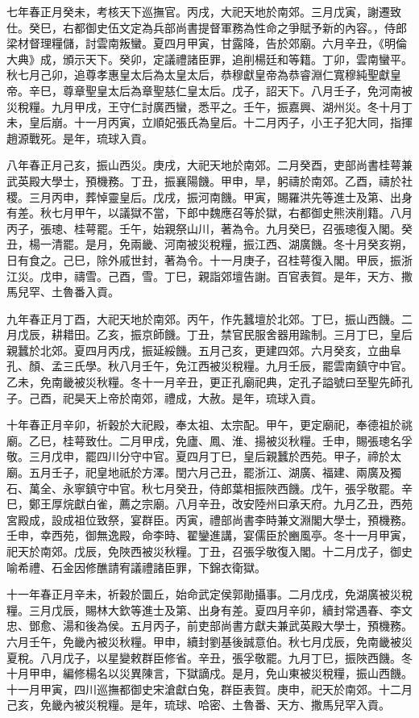 \begin{pinyinscope}
七年春正月癸未，考核天下巡撫官。丙戌，大祀天地於南郊。三月戊寅，謝遷致仕。癸巳，右都御史伍文定為兵部尚書提督軍務為性命之爭賦予新的內容。，侍郎梁材督理糧儲，討雲南叛蠻。夏四月甲寅，甘露降，告於郊廟。六月辛丑，《明倫大典》成，頒示天下。癸卯，定議禮諸臣罪，追削楊廷和等籍。丁卯，雲南蠻平。秋七月己卯，追尊孝惠皇太后為太皇太后，恭穆獻皇帝為恭睿淵仁寬穆純聖獻皇帝。辛巳，尊章聖皇太后為章聖慈仁皇太后。戊子，詔天下。八月壬子，免河南被災稅糧。九月甲戌，王守仁討廣西蠻，悉平之。壬午，振嘉興、湖州災。冬十月丁未，皇后崩。十一月丙寅，立順妃張氏為皇后。十二月丙子，小王子犯大同，指揮趙源戰死。是年，琉球入貢。

八年春正月己亥，振山西災。庚戌，大祀天地於南郊。二月癸酉，吏部尚書桂萼兼武英殿大學士，預機務。丁丑，振襄陽饑。甲申，旱，躬禱於南郊。乙酉，禱於社稷。三月丙申，葬悼靈皇后。戊戌，振河南饑。甲寅，賜羅洪先等進士及第、出身有差。秋七月甲午，以議獄不當，下郎中魏應召等於獄，右都御史熊浹削籍。八月丙子，張璁、桂萼罷。壬午，始親祭山川，著為令。九月癸巳，召張璁復入閣。癸丑，楊一清罷。是月，免兩畿、河南被災稅糧，振江西、湖廣饑。冬十月癸亥朔，日有食之。己巳，除外戚世封，著為令。十一月庚子，召桂萼復入閣。甲辰，振浙江災。戊申，禱雪。己酉，雪。丁巳，親詣郊壇告謝。百官表賀。是年，天方、撒馬兒罕、土魯番入貢。

九年春正月丁酉，大祀天地於南郊。丙午，作先蠶壇於北郊。丁巳，振山西饑。二月戊辰，耕耤田。乙亥，振京師饑。丁丑，禁官民服舍器用踰制。三月丁巳，皇后親蠶於北郊。夏四月丙戌，振延綏饑。五月己亥，更建四郊。六月癸亥，立曲阜孔、顏、孟三氏學。秋八月壬午，免江西被災稅糧。九月壬辰，罷雲南鎮守中官。乙未，免南畿被災秋糧。冬十一月辛丑，更正孔廟祀典，定孔子謚號曰至聖先師孔子。己酉，祀昊天上帝於南郊，禮成，大赦。是年，琉球入貢。

十年春正月辛卯，祈穀於大祀殿，奉太祖、太宗配。甲午，更定廟祀，奉德祖於祧廟。乙巳，桂萼致仕。二月甲戌，免廬、鳳、淮、揚被災秋糧。壬申，賜張璁名孚敬。三月戊申，罷四川分守中官。夏四月丁巳，皇后親蠶於西苑。甲子，禘於太廟。五月壬子，祀皇地祇於方澤。閏六月己丑，罷浙江、湖廣、福建、兩廣及獨石、萬全、永寧鎮守中官。秋七月癸丑，侍郎葉相振陜西饑。戊午，張孚敬罷。辛巳，鄭王厚烷獻白雀，薦之宗廟。八月辛丑，改安陸州曰承天府。九月乙丑，西苑宮殿成，設成祖位致祭，宴群臣。丙寅，禮部尚書李時兼文淵閣大學士，預機務。壬申，幸西苑，御無逸殿，命李時、翟鑾進講，宴儒臣於豳風亭。冬十一月甲寅，祀天於南郊。戊辰，免陜西被災秋糧。丁丑，召張孚敬復入閣。十二月戊子，御史喻希禮、石金因修醮請宥議禮諸臣罪，下錦衣衛獄。

十一年春正月辛未，祈穀於圜丘，始命武定侯郭勛攝事。二月戊戌，免湖廣被災稅糧。三月戊辰，賜林大欽等進士及第、出身有差。夏四月辛卯，續封常遇春、李文忠、鄧愈、湯和後為侯。五月丙子，前吏部尚書方獻夫兼武英殿大學士，預機務。六月壬午，免畿內被災秋糧。甲申，續封劉基後誠意伯。秋七月戊辰，免南畿被災夏稅。八月戊子，以星變敕群臣修省。辛丑，張孚敬罷。九月丁巳，振陜西饑。冬十月甲申，編修楊名以災異陳言，下獄謫戍。是月，免山東被災稅糧，振山西饑。十一月甲寅，四川巡撫都御史宋滄獻白兔，群臣表賀。庚申，祀天於南郊。十二月己亥，免畿內被災稅糧。是年，琉球、哈密、土魯番、天方、撒馬兒罕入貢。


\end{pinyinscope}
